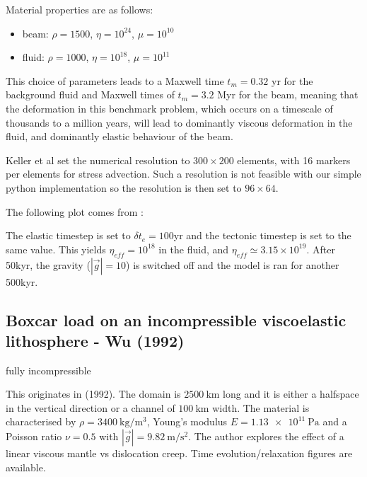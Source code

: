 Material properties are as follows:
\begin{itemize}
\item beam: $\rho=1500$, $\eta=10^{24}$, $\mu=10^{10}$
\item fluid: $\rho=1000$, $\eta=10^{18}$, $\mu=10^{11}$
\end{itemize}

This choice of parameters leads to a Maxwell time 
$t_m = 0.32$ yr for the background fluid and Maxwell times of  
$t_m = 3.2$ Myr for the beam, meaning that the deformation in this benchmark problem, 
which occurs on a timescale of thousands to a million years, 
will lead to dominantly viscous deformation in the fluid, 
and dominantly elastic behaviour of the beam. 

Keller et al set the numerical resolution to $300\times200$ elements, 
with 16 markers per elements for stress advection. Such a resolution is  
not feasible with our simple python implementation so the resolution is
then set to $96\times64$. 

The following plot comes from \cite{kemk13}:
\begin{center}
\end{center}

The elastic timestep is set to $\delta t_e=100$yr and the tectonic timestep is set to the same value.
This yields $\eta_{eff}=10^{18}$ in the fluid, and $\eta_{eff}\simeq 3.15\times 10^{19}$.
After 50kyr, the gravity ($|\vec{g}|=10$) is switched off and the model is ran for another 
500kyr.


\subsection{Boxcar load on an incompressible viscoelastic lithosphere - Wu (1992)}

{\color{orange} fully incompressible}

This originates in \textcite{wu92} (1992).
The domain is $2500~\si{\km}$ long and it is either 
a halfspace in the vertical direction 
or a channel of $100~\si{\km}$ width. 
The material is characterised by 
$\rho=3400~\si{\kg\per\cubic\meter}$, 
Young's modulus $E=\SI{1.13e11}{\pascal}$ 
and a Poisson ratio $\nu=0.5$ with $|\vec{g}|=9.82~\si{\meter\per\square\second}$.
The author explores the effect of a linear viscous mantle vs dislocation creep.
Time evolution/relaxation figures are available.

